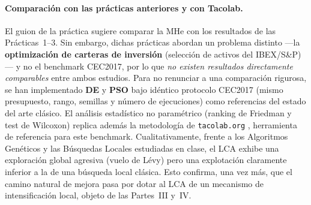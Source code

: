 \paragraph{Comparación con las prácticas anteriores y con Tacolab.}
El guion de la práctica sugiere comparar la MHe con los resultados de las Prácticas~1--3.
Sin embargo, dichas prácticas abordan un problema distinto ---la \textbf{optimización de
carteras de inversión} (selección de activos del IBEX/S\&P)--- y no el benchmark CEC2017,
por lo que \emph{no existen resultados directamente comparables} entre ambos estudios.
Para no renunciar a una comparación rigurosa, se han implementado \textbf{DE} y \textbf{PSO}
bajo idéntico protocolo CEC2017 (mismo presupuesto, rango, semillas y número de ejecuciones)
como referencias del estado del arte clásico. El análisis estadístico no paramétrico
(ranking de Friedman y test de Wilcoxon) replica además la metodología de
\texttt{tacolab.org} \cite{tacolab}, herramienta de referencia para este benchmark.
Cualitativamente, frente a los Algoritmos Genéticos y las Búsquedas Locales estudiadas en
clase, el LCA exhibe una exploración global agresiva (vuelo de Lévy) pero una explotación
claramente inferior a la de una búsqueda local clásica. Esto confirma, una vez más, que el
camino natural de mejora pasa por dotar al LCA de un mecanismo de intensificación local,
objeto de las Partes~III y~IV.

